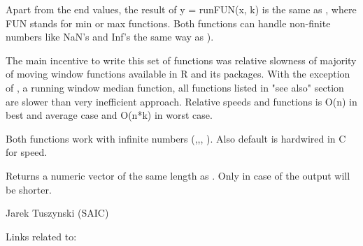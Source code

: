 \begin{Details}\relax
Apart from the end values, the result of y = runFUN(x, k) is the same as 
, where FUN 
stands for min or max functions.  Both functions can handle non-finite 
numbers like NaN's and Inf's the same way as ).


The main incentive to write this set of functions was relative slowness of 
majority of moving window functions available in R and its packages.  With the 
exception of , a running window median function, all 
functions listed in "see also" section are slower than very inefficient 
 approach. Relative 
speeds  and  functions is O(n) in best and average 
case and O(n*k) in worst case.

Both functions work with infinite numbers (,,,
). Also default  is hardwired in C for speed.
\end{Details}
\begin{Value}
Returns a numeric vector of the same length as . Only in case of 
 the output will be shorter.
\end{Value}
\begin{Author}\relax
Jarek Tuszynski (SAIC) 
\end{Author}
\begin{SeeAlso}\relax
Links related to:
\end{SeeAlso}
